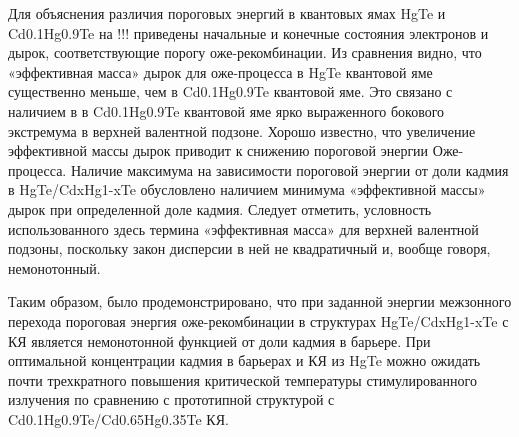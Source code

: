 \documentclass[../main.tex]{subfiles}
\begin{document}
    Для объяснения различия пороговых энергий в квантовых ямах HgTe и Cd0.1Hg0.9Te на !!! приведены начальные и конечные состояния электронов 
    и дырок, соответствующие порогу оже-рекомбинации. Из сравнения видно, что «эффективная масса» дырок для оже-процесса в HgTe квантовой яме 
    существенно меньше, чем в Cd0.1Hg0.9Te квантовой яме. Это связано с наличием в в Cd0.1Hg0.9Te квантовой яме ярко выраженного бокового 
    экстремума в верхней валентной подзоне. Хорошо известно, что увеличение эффективной массы дырок приводит к снижению пороговой энергии 
    Оже-процесса. Наличие максимума на зависимости пороговой энергии от доли кадмия в HgTe/CdxHg1-xTe обусловлено наличием минимума 
    «эффективной массы» дырок при определенной доле кадмия. Следует отметить, условность использованного здесь термина «эффективная масса» 
    для верхней валентной подзоны, поскольку закон дисперсии в ней не квадратичный и, вообще говоря, немонотонный.

    Таким образом, было продемонстрировано, что при заданной энергии межзонного перехода пороговая энергия оже-рекомбинации в структурах 
    HgTe/CdxHg1-xTe с КЯ является немонотонной функцией от доли кадмия в барьере. При оптимальной концентрации кадмия в барьерах и КЯ из HgTe 
    можно ожидать почти трехкратного повышения критической температуры стимулированного излучения по сравнению с прототипной структурой с 
    Cd0.1Hg0.9Te/Cd0.65Hg0.35Te КЯ.
\end{document}

